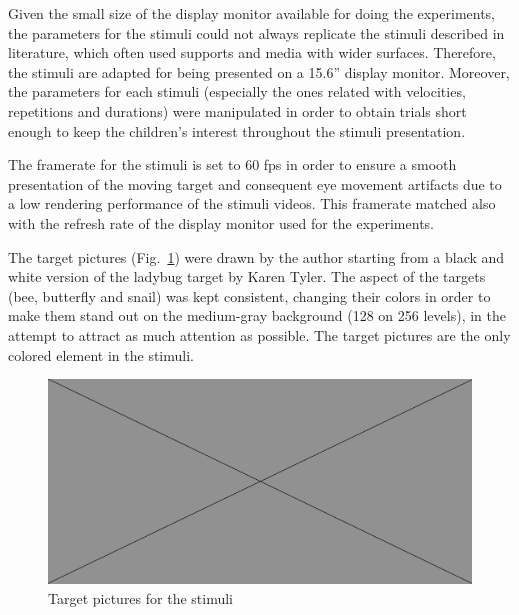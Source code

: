 Given the small size of the display monitor available for doing the experiments, the parameters for the stimuli could not always replicate the stimuli described in literature, which often used supports and media with wider surfaces. Therefore, the stimuli are adapted for being presented on a 15.6” display monitor. Moreover, the parameters for each stimuli (especially the ones related with velocities, repetitions and durations) were manipulated in order to obtain trials short enough to keep the children’s interest throughout the stimuli presentation.

The framerate for the stimuli is set to 60 fps in order to ensure a smooth presentation of the moving target and consequent eye movement artifacts due to a low rendering performance of the stimuli videos. This framerate matched also with the refresh rate of the display monitor used for the experiments.

The target pictures (Fig.~\ref{fig:stimulitargets}) were drawn by the author starting from a black and white version of the ladybug target by Karen Tyler. The aspect of the targets (bee, butterfly and snail) was kept consistent, changing their colors in order to make them stand out on the medium-gray background (128 on 256 levels), in the attempt to attract as much attention as possible. The target pictures are the only colored element in the stimuli.

\begin{figure}[h]
  \centering
  \includegraphics[width=.5\textwidth]{figures/placeholderImg.jpg}
  \caption[Target pictures for the stimuli]{Target pictures for the stimuli}
  \label{fig:stimulitargets}
\end{figure}

